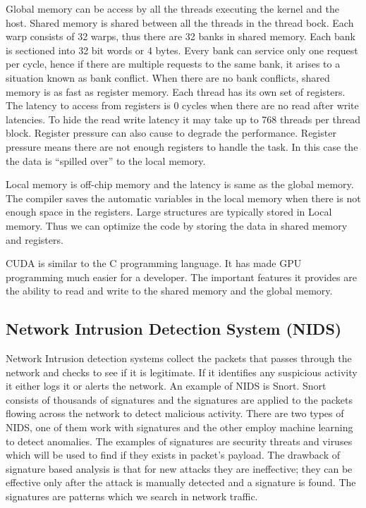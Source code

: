 Global memory can be access by all the threads executing the kernel and the host. Shared memory is shared between all the threads in the thread bock. Each warp consists of 32 warps, thus there are 32 banks in shared memory. Each bank is sectioned into 32 bit words or 4 bytes. Every bank can service only one request per cycle, hence if there are multiple requests to the same bank, it arises to a situation known as bank conflict. When there are no bank conflicts, shared memory is as fast as register memory. Each thread has its own set of registers. The latency to access from registers is 0 cycles when there are no read after write latencies. To hide the read write latency it may take up to 768 threads per thread block. Register pressure can also cause to degrade the performance. Register pressure means there are not enough registers to handle the task. In this case the the data is “spilled over” to the local memory. 

Local memory is off-chip memory and the latency is same as the global memory. The compiler saves the automatic variables in the local memory when there is not enough space in the registers. Large structures are typically stored in Local memory. Thus we can optimize the code by storing the data in shared memory and registers.

CUDA is similar to the C programming language. It has made GPU programming much easier for a developer. The important features it provides are the ability to read and write to the shared memory and the global memory.

\subsection{Network Intrusion Detection System (NIDS)}
Network Intrusion detection systems collect the packets that passes through the network and checks to see if it is legitimate. If it identifies any suspicious activity it either logs it or alerts the network. An example of NIDS is Snort. Snort consists of thousands of signatures and the signatures are applied to the packets flowing across the network to detect malicious activity. There are two types of NIDS, one of them work with signatures and the other employ machine learning to detect anomalies. The examples of signatures are security threats and viruses which will be used to find if they exists in packet’s payload. The drawback of signature based analysis is that for new attacks they are ineffective; they can be effective only after the attack is manually detected and a signature is found. The signatures are patterns which we search in network traffic. 

